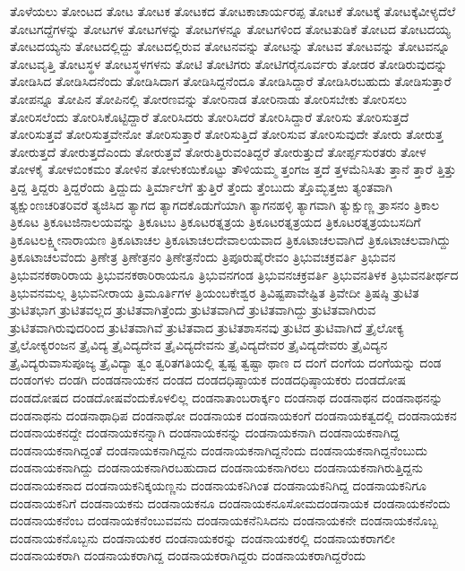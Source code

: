 {ತೊಳೆಯಲು
ತೋಂಟದ
ತೋಟ
ತೋಟಕ
ತೋಟಕದ
ತೋಟಕಾಚಾರ್ಯರಪ್ಪ
ತೋಟಕೆ
ತೋಟಕ್ಕೆ
ತೋಟಕ್ಕೆವೀಳ್ಯದೆಲೆ
ತೋಟಗದ್ದೆಗಳನ್ನು
ತೋಟಗಳ
ತೋಟಗಳನ್ನು
ತೋಟಗಳನ್ನೂ
ತೋಟಗಳಿಂದ
ತೋಟತುಡಿಕೆ
ತೋಟದ
ತೋಟದಯ್ಯ
ತೋಟದಯ್ಯನು
ತೋಟದಲ್ಲಿದ್ದು
ತೋಟದಲ್ಲಿರುವ
ತೋಟನವನ್ನು
ತೋಟನ್ನು
ತೋಟವ
ತೋಟವನ್ನು
ತೋಟವನ್ನೂ
ತೋಟವೃತ್ತಿ
ತೋಟಸ್ಥಳ
ತೋಟಸ್ಥಳಗಳನು
ತೋಟಿ
ತೋಟಿಗರು
ತೋಟಿಗರೈನೂರ್ವರು
ತೋಡರ
ತೋಡಿರುವುದನ್ನು
ತೋಡಿಸಿದ
ತೋಡಿಸಿದನೆಂದು
ತೋಡಿಸಿದಾಗ
ತೋಡಿಸಿದ್ದನೆಂದೂ
ತೋಡಿಸಿದ್ದಾರೆ
ತೋಡಿಸಿರಬಹುದು
ತೋಡಿಸುತ್ತಾರೆ
ತೋಪನ್ನೂ
ತೋಪಿನ
ತೋಪಿನಲ್ಲಿ
ತೋರಣವನ್ನು
ತೋರಿನಾಡ
ತೋರಿನಾಡು
ತೋರಿಸಬೇಕು
ತೋರಿಸಲು
ತೋರಿಸಲೆಂದು
ತೋರಿಸಿಕೊಟ್ಟಿದ್ದಾರೆ
ತೋರಿಸಿದರು
ತೋರಿಸಿದರೆ
ತೋರಿಸಿದ್ದಾರೆ
ತೋರಿಸು
ತೋರಿಸುತ್ತದೆ
ತೋರಿಸುತ್ತವೆ
ತೋರಿಸುತ್ತವೇನೋ
ತೋರಿಸುತ್ತಾರೆ
ತೋರಿಸುತ್ತಿದೆ
ತೋರಿಸುವ
ತೋರಿಸುವುದೇ
ತೋರು
ತೋರುತ್ತ
ತೋರುತ್ತದೆ
ತೋರುತ್ತದೆಎಂದು
ತೋರುತ್ತವೆ
ತೋರುತ್ತಿರುವಂತಿದ್ದರೆ
ತೋರುತ್ತುದೆ
ತೋರ್ಪ್ಪಸುರತರು
ತೋಳ
ತೋಳಕೈ
ತೋಳಬಿಂಕಮಂ
ತೋಳಿನ
ತೋಳುಕಯಿಕೊಟ್ಟು
ತೌಳಿಯಮ್ಮ
ತ್ತಂಗಜ
ತ್ತದೆ
ತ್ತಳಮೆನಿಸಿತು
ತ್ತಾನೆ
ತ್ತಾರೆ
ತ್ತಿತ್ತು
ತ್ತಿದ್ದ
ತ್ತಿದ್ದರು
ತ್ತಿದ್ದರೆಂದು
ತ್ತಿದ್ದುದು
ತ್ತಿರ್ಮಾಲೆಗೆ
ತ್ತುತ್ತಿರೆ
ತ್ತೆಂದು
ತ್ತೆಂಬುದು
ತ್ತೊಮ್ಭತ್ತಱು
ತ್ಯಂತವಾಗಿ
ತ್ಯಕ್ಷುಂಣಚರಿತರಿವರೆ
ತ್ಯಜಿಸಿದ
ತ್ಯಾಗದ
ತ್ಯಾಗದಕೊಡುಗೆಯಾಗಿ
ತ್ಯಾಗನಹಳ್ಳಿ
ತ್ಯಾಗವಾಗಿ
ತ್ಯುಕ್ಷುಣ್ಣ
ತ್ರಾಸನಂ
ತ್ರಿಕಾಲ
ತ್ರಿಕೂಟ
ತ್ರಿಕೂಟಜಿನಾಲಯವನ್ನು
ತ್ರಿಕೂಟಬ
ತ್ರಿಕೂಟರತ್ನತ್ರಯ
ತ್ರಿಕೂಟರತ್ನತ್ರಯದ
ತ್ರಿಕೂಟರತ್ನತ್ರಯಬಸದಿಗೆ
ತ್ರಿಕೂಟಲಕ್ಷ್ಮೀನಾರಾಯಣ
ತ್ರಿಕೂಟಾಚಲ
ತ್ರಿಕೂಟಾಚಲದೇವಾಲಯವಾದ
ತ್ರಿಕೂಟಾಚಲವಾಗಿದೆ
ತ್ರಿಕೂಟಾಚಲವಾಗಿದ್ದು
ತ್ರಿಕೂಟಾಚಲವೆಂದು
ತ್ರಿಣೇತ್ರ
ತ್ರಿಣೇತ್ರನಂ
ತ್ರಿಣೇತ್ರನೆಂದು
ತ್ರಿಪೂರುಷೈರೇವಂ
ತ್ರಿಭುವಚಕ್ರವರ್ತಿ
ತ್ರಿಭುವನ
ತ್ರಿಭುವನಕಠಾರಿರಾಯ
ತ್ರಿಭುವನಕಠಾರಿರಾಯನೂ
ತ್ರಿಭುವನಗಂಡ
ತ್ರಿಭುವನಚಕ್ರವರ್ತಿ
ತ್ರಿಭುವನತಿಳಕ
ತ್ರಿಭುವನತೀರ್ಥದ
ತ್ರಿಭುವನಮಲ್ಲ
ತ್ರಿಭುವನೀರಾಯ
ತ್ರಿಮೂರ್ತಿಗಳ
ತ್ರಿಯಂಬಕೇಶ್ವರ
ತ್ರಿವಿಷ್ಟಪಾವೇಷ್ಟಿತ
ತ್ರಿವೇದೀ
ತ್ರಿಷಷ್ಠಿ
ತ್ರುಟಿತ
ತ್ರುಟಿತಭಾಗ
ತ್ರುಟಿತವಲ್ಲದ
ತ್ರುಟಿತವಾಗಿತ್ತೆಂದು
ತ್ರುಟಿತವಾಗಿದೆ
ತ್ರುಟಿತವಾಗಿದ್ದು
ತ್ರುಟಿತವಾಗಿರುವ
ತ್ರುಟಿತವಾಗಿರುವುದರಿಂದ
ತ್ರುಟಿತವಾಗಿವೆ
ತ್ರುಟಿತವಾದ
ತ್ರುಟಿತಶಾಸನವು
ತ್ರುಟಿದ
ತ್ರುಟಿವಾಗಿದೆ
ತ್ರೈಲೋಕ್ಯ
ತ್ರೈಲೋಕ್ಯರಂಜನ
ತ್ರೈವಿದ್ಯ
ತ್ರೈವಿದ್ಯದೇವ
ತ್ರೈವಿದ್ಯದೇವನು
ತ್ರೈವಿದ್ಯದೇವರ
ತ್ರೈವಿದ್ಯದೇವರು
ತ್ರೈವಿದ್ಯನ
ತ್ರೈವಿದ್ಯರುವಾಸುಪೂಜ್ಯ
ತ್ರೈವಿದ್ಯಾ
ತ್ವಂ
ತ್ವರಿತಗತಿಯಲ್ಲಿ
ತ್ವಷ್ಟ
ತ್ವಷ್ಟಾ
ಥಾಣ
ದ
ದಂಗೆ
ದಂಗೆಯ
ದಂಗೆಯನ್ನು
ದಂಡ
ದಂಡಂಗಳು
ದಂಡಗಿ
ದಂಡಡನಾಯಕನ
ದಂಡದ
ದಂಡದಧಿಷ್ಠಾಯಕ
ದಂಡದಧಿಷ್ಠಾಯಕರು
ದಂಡದೋಷ
ದಂಡದೋಷದ
ದಂಡದೋಷವೆಂದುಕೊಳಲಿಲ್ಲ
ದಂಡನಾತಾಂಬರಾರ್ಕ್ಕಂ
ದಂಡನಾಥ
ದಂಡನಾಥನ
ದಂಡನಾಥನನ್ನು
ದಂಡನಾಥನು
ದಂಡನಾಥಾಧಿಪ
ದಂಡನಾಥೋ
ದಂಡನಾಯಕ
ದಂಡನಾಯಕಂಗೆ
ದಂಡನಾಯಕತ್ವದಲ್ಲಿ
ದಂಡನಾಯಕನ
ದಂಡನಾಯಕನದ್ದೇ
ದಂಡನಾಯಕನನ್ನಾಗಿ
ದಂಡನಾಯಕನನ್ನು
ದಂಡನಾಯಕನಾಗಿ
ದಂಡನಾಯಕನಾಗಿದ್ದ
ದಂಡನಾಯಕನಾಗಿದ್ದಂತೆ
ದಂಡನಾಯಕನಾಗಿದ್ದನು
ದಂಡನಾಯಕನಾಗಿದ್ದನೆಂದು
ದಂಡನಾಯಕನಾಗಿದ್ದನೆಂಬುದು
ದಂಡನಾಯಕನಾಗಿದ್ದು
ದಂಡನಾಯಕನಾಗಿರಬಹುದಾದ
ದಂಡನಾಯಕನಾಗಿರಲು
ದಂಡನಾಯಕನಾಗಿರುತ್ತಿದ್ದನು
ದಂಡನಾಯಕನಾದ
ದಂಡನಾಯಕನಿಕ್ಕಯಣ್ಣನು
ದಂಡನಾಯಕನಿಗಿಂತ
ದಂಡನಾಯಕನಿಗಿದ್ದ
ದಂಡನಾಯಕನಿಗೂ
ದಂಡನಾಯಕನಿಗೆ
ದಂಡನಾಯಕನು
ದಂಡನಾಯಕನೂ
ದಂಡನಾಯಕನೂಸೋಮದಂಡನಾಯಕ
ದಂಡನಾಯಕನೆಂದು
ದಂಡನಾಯಕನೆಂಬ
ದಂಡನಾಯಕನೆಂಬುವವನು
ದಂಡನಾಯಕನೆನಿಸಿದನು
ದಂಡನಾಯಕನೇ
ದಂಡನಾಯಕನೊಬ್ಬ
ದಂಡನಾಯಕನೊಬ್ಬನು
ದಂಡನಾಯಕರ
ದಂಡನಾಯಕರನ್ನು
ದಂಡನಾಯಕರಲ್ಲಿ
ದಂಡನಾಯಕರಾಗಲೀ
ದಂಡನಾಯಕರಾಗಿ
ದಂಡನಾಯಕರಾಗಿದ್ದ
ದಂಡನಾಯಕರಾಗಿದ್ದರು
ದಂಡನಾಯಕರಾಗಿದ್ದರೆಂದು
}
